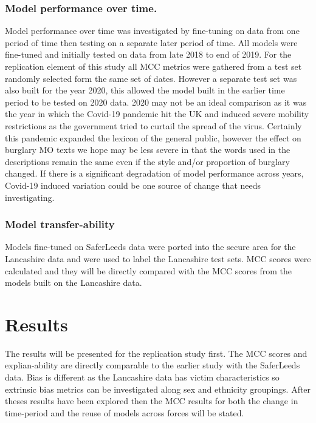 \subsubsection{Model performance over time.} Model performance over time was investigated by fine-tuning on data from one period of time then testing on a separate later period of time. All models were fine-tuned and initially tested on data  from late 2018 to end of 2019. For the replication element of this study all MCC metrics were gathered from a test set randomly selected form the same set of dates. However a separate test set was also built for the year 2020, this allowed the model built in the earlier time period to be tested on 2020 data. 2020 may not be an ideal comparison as it  was the year in which the Covid-19 pandemic hit the UK and induced severe mobility restrictions as the government tried to curtail the spread of the virus. Certainly this pandemic expanded the lexicon of the general public, however the effect on burglary MO texts we hope may be less severe in that the words used in the descriptions remain the same even if the style and/or proportion of burglary changed. If there is a significant degradation of model performance across years, Covid-19 induced variation could be one source of change that needs investigating.     

\subsubsection{Model transfer-ability} Models fine-tuned on SaferLeeds data were ported into the secure area for the Lancashire data and were used to label the Lancashire test sets. MCC scores were calculated and they will be directly compared with the MCC scores from the models built on the Lancashire data.

\section{Results} The results will be presented for the replication study first. The MCC scores and explian-ability are directly comparable to the earlier study with the SaferLeeds data. Bias is different as the Lancashire data has victim characteristics so extrinsic bias metrics can be investigated along sex and ethnicity groupings. After theses results have been explored then the MCC results for both the change in time-period and the reuse of models across forces will be stated.

